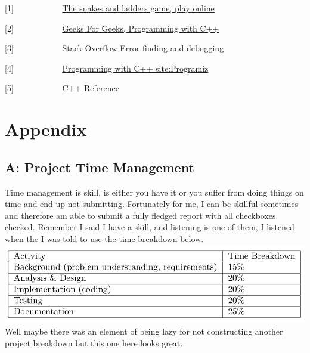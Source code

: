 [1] \ \ \ \ \ \ \ \ \ \ \   \href{https://www.crazygames.com/game/snakes-and-ladders}{The snakes and ladders game, play online}

[2] \ \ \ \ \ \ \ \ \ \ \   \href{https://geeksforgeeks.org}{Geeks For Geeks, Programming with C++}

[3] \ \ \ \ \ \ \ \ \ \ \   \href{https://Stackoverflow.com}{Stack Overflow Error finding and debugging}

[4] \ \ \ \ \ \ \ \ \ \ \   \href{https://www.programiz.com/cpp-programming}{Programming with C++ site:Programiz}

[5] \ \ \ \ \ \ \ \ \ \ \   \href{http://www.cplusplus.com/reference/}{C++ Reference }

\newpage
\section*{Appendix}

\subsection*{A: Project Time Management}
Time management is skill, is either you have it or you suffer from doing things on time and end up not submitting. Fortunately for me, I can be skillful sometimes and therefore am able to submit a fully fledged report with all checkboxes checked. Remember I said I have a skill, and listening is one of them, I listened when the I was told to use the time breakdown below. \\
\includegraphics[scale=0.5]{Time.png} \\
Well maybe there was an element of being lazy for not constructing another project breakdown but this one here looks great.
